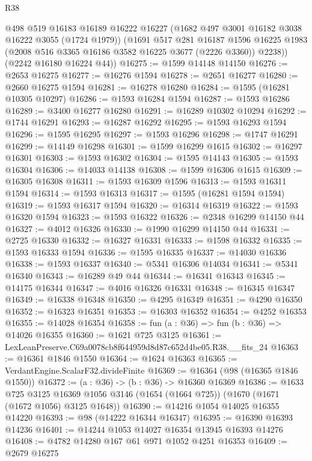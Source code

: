 \begin{lexlean}{R38}
\begin{coremodule}
        @498
        @519
        @16183
        @16189
        @16222
        @16227
        (@1682 @497 @3001 @16182 @3038 @16222 @3055 (@1724 @1979))
        (@1691
          @517
          @281
          @16187
          @1596
          @16225
          @1983
          (@2008 @516 @3365 @16186 @3582 @16225 @3677 (@2226 @3360))
          @2238))
      (@2242 @16180 @16224 @44))
@16275 := @1599 @14148 @14150
@16276 := @2653 @16275
@16277 := @16276 @1594
@16278 := @2651 @16277
@16280 := @2660 @16275 @1594
@16281 := @16278 @16280
@16284 := @1595 (@16281 @10305 @10297)
@16286 := @1593 @16284 @1594
@16287 := @1593 @16286
@16289 := @3400 @16277 @16280
@16291 := @16289 @10302 @10294
@16292 := @1744 @16291
@16293 := @16287 @16292
@16295 := @1593 @16293 @1594
@16296 := @1595 @16295
@16297 := @1593 @16296
@16298 := @1747 @16291
@16299 := @14149 @16298
@16301 := @1599 @16299 @1615
@16302 := @16297 @16301
@16303 := @1593 @16302
@16304 := @1595 @14143
@16305 := @1593 @16304
@16306 := @14033 @14138
@16308 := @1599 @16306 @1615
@16309 := @16305 @16308
@16311 := @1593 @16309 @1596
@16313 := @1593 @16311 @1594
@16314 := @1593 @16313
@16317 := @1595 (@16281 @1594 @1594)
@16319 := @1593 @16317 @1594
@16320 := @16314 @16319
@16322 := @1593 @16320 @1594
@16323 := @1593 @16322
@16326 := @2348 @16299 @14150 @44
@16327 := @4012 @16326
@16330 := @1990 @16299 @14150 @44
@16331 := @2725 @16330
@16332 := @16327 @16331
@16333 := @1598 @16332
@16335 := @1593 @16333 @1594
@16336 := @1595 @16335
@16337 := @14030 @16336
@16338 := @1593 @16337
@16340 := @5341 @16306 @14034
@16341 := @5341 @16340
@16343 := @16289 @49 @44
@16344 := @16341 @16343
@16345 := @14175 @16344
@16347 := @4016 @16326 @16331
@16348 := @16345 @16347
@16349 := @16338 @16348
@16350 := @4295 @16349
@16351 := @4290 @16350
@16352 := @16323 @16351
@16353 := @16303 @16352
@16354 := @4252 @16353
@16355 := @14028 @16354
@16358 := fun (a : @36) => fun (b : @36) => @14026 @16355
@16360 := @1621 @725 @3125
@16361 := LexLeanPreserve.C69a0078cb8f644959d8d87c652d4be05.R38.__fits_24
@16363 := @16361 @1846 @1550
@16364 := @1624 @16363
@16365 := VerdantEngine.ScalarF32.divideFinite
@16369 := @16364 (@98 (@16365 @1846 @1550))
@16372 := (a : @36) -> (b : @36) -> @16360 @16369
@16386 := @1633
    @725
    @3125
    @16369
    @1056
    @3146
    (@1654 (@1664 @725))
    (@1670 (@1671 (@1672 @1056) @3125 @1648))
@16390 := @14216 @1054 @14025 @16355 @14220
@16393 := @98 (@14222 @16344 @16347)
@16395 := @16390 @16393 @14236
@16401 := @14244 @1053 @14027 @16354 @13945 @16393 @14276
@16408 := @4782 @14280 @167 @61 @971 @1052 @4251 @16353
@16409 := @2679 @16275

\end{coremodule}
\end{lexlean}
